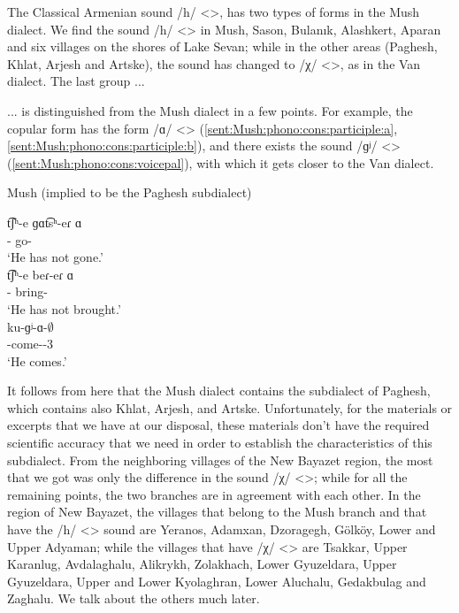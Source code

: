 The Classical Armenian sound /h/ <>, has two types of forms in the Mush dialect. We find the sound /h/ <> in Mush, Sason, Bulanık, Alashkert, Aparan and six villages on the shores of Lake Sevan; while in the other areas (Paghesh, Khlat, Arjesh and Artske), the sound has changed to /χ/ <>, as in the Van dialect. The last group ... 

\begin{adjarianpage}\label{page:118}\end{adjarianpage}%

... is distinguished from the Mush dialect in a few points. For example, the copular form has the form /ɑ/ <> (\ref{sent:Mush:phono:cons:participle:a}, \ref{sent:Mush:phono:cons:participle:b}), and there exists the sound /ɡʲ/ <> (\ref{sent:Mush:phono:cons:voicepal}), with which it gets closer to the Van dialect. 

\begin{exe}
	\ex Mush (implied to be the Paghesh subdialect) 
	\begin{xlist}
		\ex \gll t͡ʃʰ-e ɡɑt͡sʰ-eɾ ɑ \\
		{\neggloss}-{\aux} go-{\perfcvb} {\aux} \\
		\trans `He has not gone.'\label{sent:Mush:phono:cons:participle:a} \\
		\ex \gll t͡ʃʰ-e beɾ-eɾ ɑ \\
		{\neggloss}-{\aux} bring-{\perfcvb} {\aux} \\
		\trans `He has not brought.' \label{sent:Mush:phono:cons:participle:b}\\
		\ex \gll ku-ɡʲ-ɑ-$\emptyset$ \\
		{\ind}-come-{\thgloss}-3{\sg}\\
		\trans `He comes.' \label{sent:Mush:phono:cons:voicepal}\\
	\end{xlist}
\end{exe}

It follows from here that the Mush dialect contains the subdialect of Paghesh, which contains also Khlat, Arjesh, and Artske. Unfortunately, for the materials or excerpts that we have at our disposal, these materials don't have the required scientific accuracy that we need in order to establish the characteristics of this subdialect. From the neighboring villages of the New Bayazet region, the most that we got was only the difference in the sound /χ/ <>; while for all the remaining points, the two branches are in agreement with each other. In the region of New Bayazet, the villages that belong to the Mush branch and that have the /h/ <> sound are Yeranos, Adamxan, Dzoragegh, Gölköy, Lower and Upper Adyaman; while the villages that have /χ/ <> are Tsakkar, Upper Karanlug, Avdalaghalu, Alikrykh, Zolakhach, Lower Gyuzeldara, Upper Gyuzeldara, Upper and Lower Kyolaghran, Lower Aluchalu, Gedakbulag and Zaghalu. We talk about the others much later. 

